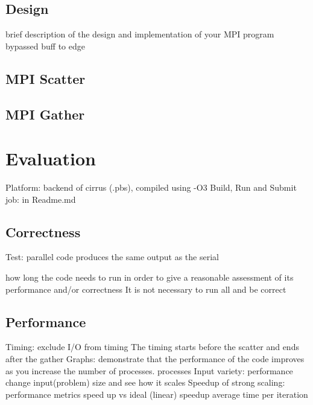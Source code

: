 \documentclass[12pt,a4paper]{article}
\newcommand{\sectionVspacing}{\vspace{15pt}}
\begin{document}
\subsection{Design}
brief description of the design and implementation of your MPI program
bypassed buff to edge
\subsection{MPI Scatter}
\subsection{MPI Gather}

\sectionVspacing

\section{Evaluation}
Platform: backend of cirrus (.pbs), compiled using -O3
Build, Run and Submit job: in Readme.md

\subsection{Correctness}
Test: parallel code produces the same output as the serial

how long the code needs to run in order to give a reasonable assessment of its performance and/or correctness
It is not necessary to run all and be correct

\subsection{Performance}

Timing: exclude I/O from timing The timing starts before the scatter and ends after the gather
Graphs: demonstrate that the performance of the code improves as you increase the number of processes.
	 processes
	 Input variety: performance change input(problem) size and see how it scales
	 Speedup of strong scaling: performance metrics speed up vs ideal (linear) speedup
	 average time per iteration

\sectionVspacing


\end{document}
